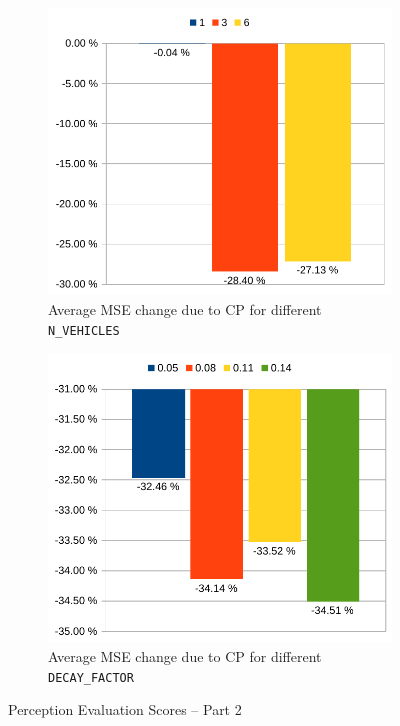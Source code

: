 \begin{figure}
	\centering
	\begin{subfigure}[b]{0.49\textwidth}
		\includegraphics[width=1\linewidth]{98_images/eval_barplot_nvehicles}
		\caption{Average MSE change due to CP for different \texttt{N\_VEHICLES}}
		\label{fig:eval_barplot_1} 
	\end{subfigure}
	\begin{subfigure}[b]{0.49\textwidth}
		\includegraphics[width=1\linewidth]{98_images/eval_barplot_decay}
		\caption{Average MSE change due to CP for different \texttt{DECAY\_FACTOR}}
		\label{fig:eval_barplot_2}
	\end{subfigure}
	\caption{Perception Evaluation Scores – Part 2}
	\label{fig:perception_evalutation_scores_2}
\end{figure}


